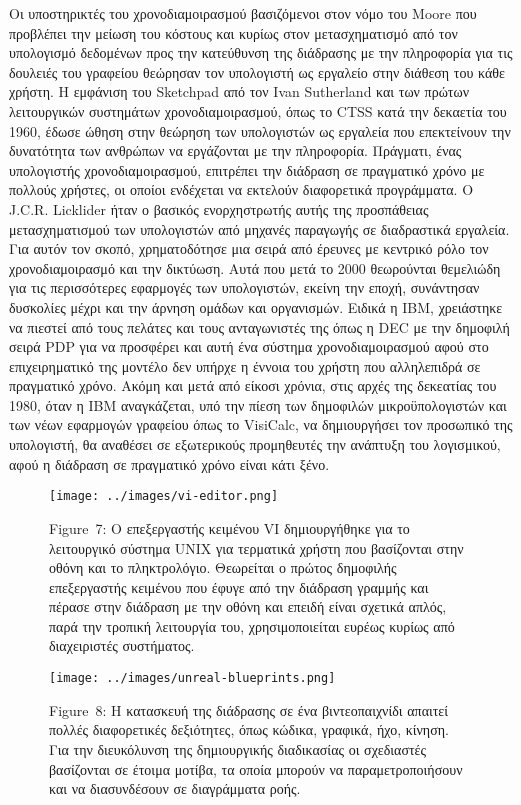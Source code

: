 \documentclass[
]{article}
\begin{document}
Οι υποστηρικτές του χρονοδιαμοιρασμού βασιζόμενοι στον νόμο του Moore
που προβλέπει την μείωση του κόστους και κυρίως στον μετασχηματισμό από
τον υπολογισμό δεδομένων προς την κατεύθυνση της διάδρασης με την
πληροφορία για τις δουλειές του γραφείου θεώρησαν τον υπολογιστή ως
εργαλείο στην διάθεση του κάθε χρήστη. Η εμφάνιση του Sketchpad από τον
Ivan Sutherland και των πρώτων λειτουργικών συστημάτων
χρονοδιαμοιρασμού, όπως το CTSS κατά την δεκαετία του 1960, έδωσε ώθηση
στην θεώρηση των υπολογιστών ως εργαλεία που επεκτείνουν την δυνατότητα
των ανθρώπων να εργάζονται με την πληροφορία. Πράγματι, ένας υπολογιστής
χρονοδιαμοιρασμού, επιτρέπει την διάδραση σε πραγματικό χρόνο με πολλούς
χρήστες, οι οποίοι ενδέχεται να εκτελούν διαφορετικά προγράμματα. Ο
J.C.R. Licklider ήταν ο βασικός ενορχηστρωτής αυτής της προσπάθειας
μετασχηματισμού των υπολογιστών από μηχανές παραγωγής σε διαδραστικά
εργαλεία. Για αυτόν τον σκοπό, χρηματοδότησε μια σειρά από έρευνες με
κεντρικό ρόλο τον χρονοδιαμοιρασμό και την δικτύωση. Αυτά που μετά το
2000 θεωρούνται θεμελιώδη για τις περισσότερες εφαρμογές των
υπολογιστών, εκείνη την εποχή, συνάντησαν δυσκολίες μέχρι και την άρνηση
ομάδων και οργανισμών. Ειδικά η IBM, χρειάστηκε να πιεστεί από τους
πελάτες και τους ανταγωνιστές της όπως η DEC με την δημοφιλή σειρά PDP
για να προσφέρει και αυτή ένα σύστημα χρονοδιαμοιρασμού αφού στο
επιχειρηματικό της μοντέλο δεν υπήρχε η έννοια του χρήστη που
αλληλεπιδρά σε πραγματικό χρόνο. Ακόμη και μετά από είκοσι χρόνια, στις
αρχές της δεκεατίας του 1980, όταν η ΙΒΜ αναγκάζεται, υπό την πίεση των
δημοφιλών μικροϋπολογιστών και των νέων εφαρμογών γραφείου όπως το
VisiCalc, να δημιουργήσει τον προσωπικό της υπολογιστή, θα αναθέσει σε
εξωτερικούς προμηθευτές την ανάπτυξη του λογισμικού, αφού η διάδραση σε
πραγματικό χρόνο είναι κάτι ξένο.

\leavevmode{}%
\begin{figure}
\hypertarget{fig:vi-editor}{%
\centering
\texttt{[image: ../images/vi-editor.png]}
\caption{Figure~7: Ο επεξεργαστής κειμένου VI δημιουργήθηκε για το
λειτουργικό σύστημα UNIX για τερματικά χρήστη που βασίζονται στην οθόνη
και το πληκτρολόγιο. Θεωρείται ο πρώτος δημοφιλής επεξεργαστής κειμένου
που έφυγε από την διάδραση γραμμής και πέρασε στην διάδραση με την οθόνη
και επειδή είναι σχετικά απλός, παρά την τροπική λειτουργία του,
χρησιμοποιείται ευρέως κυρίως από διαχειριστές
συστήματος.}\label{fig:vi-editor}
}
\end{figure}

\leavevmode{}%
\begin{figure}
\hypertarget{fig:unreal-blueprints}{%
\centering
\texttt{[image: ../images/unreal-blueprints.png]}
\caption{Figure~8: Η κατασκευή της διάδρασης σε ένα βιντεοπαιχνίδι
απαιτεί πολλές διαφορετικές δεξιότητες, όπως κώδικα, γραφικά, ήχο,
κίνηση. Για την διευκόλυνση της δημιουργικής διαδικασίας οι σχεδιαστές
βασίζονται σε έτοιμα μοτίβα, τα οποία μπορούν να παραμετροποιήσουν και
να διασυνδέσουν σε διαγράμματα ροής.}\label{fig:unreal-blueprints}
}
\end{figure}
\end{document}
